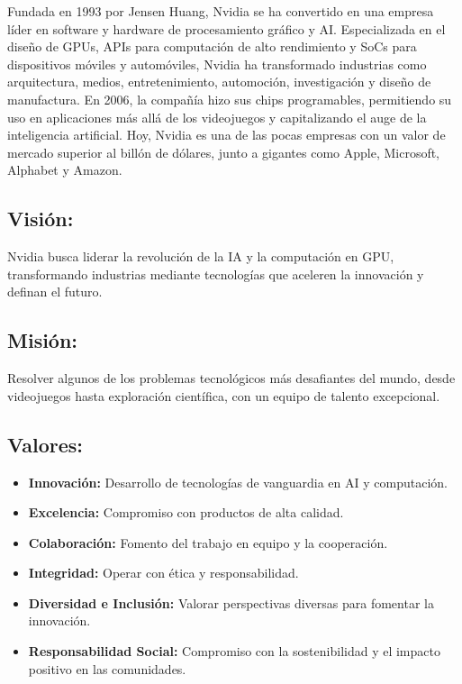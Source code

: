 \documentclass{article}
\begin{document}
Fundada en 1993 por Jensen Huang, Nvidia se ha convertido en una empresa líder en software y hardware de procesamiento gráfico y AI. Especializada en el diseño de GPUs, APIs para computación de alto rendimiento y SoCs para dispositivos móviles y automóviles, Nvidia ha transformado industrias como arquitectura, medios, entretenimiento, automoción, investigación y diseño de manufactura. En 2006, la compañía hizo sus chips programables, permitiendo su uso en aplicaciones más allá de los videojuegos y capitalizando el auge de la inteligencia artificial. Hoy, Nvidia es una de las pocas empresas con un valor de mercado superior al billón de dólares, junto a gigantes como Apple, Microsoft, Alphabet y Amazon.

\subsection{Visión:}

Nvidia busca liderar la revolución de la IA y la computación en GPU,
transformando industrias mediante tecnologías que aceleren la innovación y
definan el futuro.

\subsection{Misión:}

Resolver algunos de los problemas tecnológicos más desafiantes del
mundo, desde videojuegos hasta exploración científica, con un equipo de
talento excepcional.

\subsection{Valores:}

\begin{itemize}
  \item \textbf{Innovación:} Desarrollo de tecnologías de vanguardia en AI y computación.
  \item \textbf{Excelencia:} Compromiso con productos de alta calidad.
  \item \textbf{Colaboración:} Fomento del trabajo en equipo y la cooperación.
  \item \textbf{Integridad:} Operar con ética y responsabilidad.
  \item \textbf{Diversidad e Inclusión:} Valorar perspectivas diversas para fomentar la innovación.
  \item \textbf{Responsabilidad Social:} Compromiso con la sostenibilidad y el impacto positivo en las comunidades.
\end{itemize}
\end{document}
